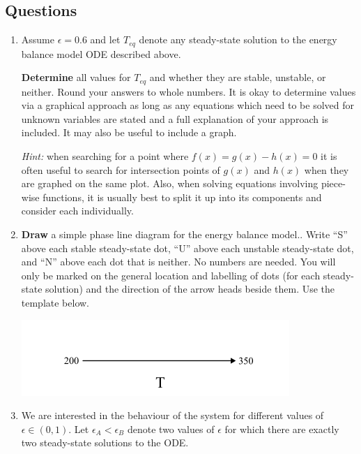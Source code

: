 \documentclass{exam}
\begin{document}
\subsection*{Questions}

\begin{enumerate}


\item Assume $\epsilon=0.6$ and let $T_{eq}$ denote any steady-state solution to the energy balance model ODE described above.

\textbf{Determine} all values for $T_{eq}$ and whether they are stable, unstable, or neither. Round your answers to whole numbers. It is okay to determine values via a graphical approach as long as any equations which need to be solved for unknown variables are stated and a full explanation of your approach is included. It may also be useful to include a graph.

\textit{Hint:} when searching for a point where $f(x)=g(x)-h(x)=0$ it is often useful to search for intersection points of $g(x)$ and $h(x)$ when they are graphed on the same plot. Also, when solving equations involving piece-wise functions, it is usually best to split it up into its components and consider each individually.




    \item \textbf{Draw} a simple phase line diagram for the energy balance model.. Write ``S'' above each stable steady-state dot, ``U'' above each unstable steady-state dot, and ``N'' above each dot that is neither. No numbers are needed. You will only be marked on the general location and labelling of dots (for each steady-state solution) and the direction of the arrow heads beside them. Use the template below.

    \begin{center}
    \includegraphics[scale=0.7]{math100phaseline1empty.png}
    \end{center}



    \item We are interested in the behaviour of the system for different values of $\epsilon \in (0,1)$. Let $\epsilon_A < \epsilon_B$ denote two values of $\epsilon$ for which there are exactly two steady-state solutions to the ODE.
    

\end{enumerate}
\end{document}
